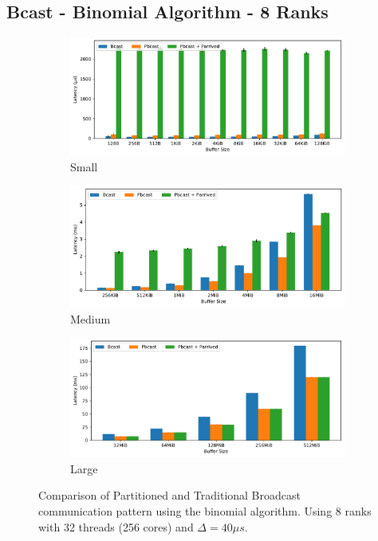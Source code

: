 \documentclass{article}
\begin{document}
  \clearpage
  \subsection{Bcast - Binomial Algorithm - 8 Ranks}
  \begin{figure}[h]
    \centering
    \begin{subfigure}[b]{0.44\textwidth}
      \centering
      \includegraphics[width=\textwidth]{data-knomial-2-bcast/small.pdf}
      \caption{Small}
    \end{subfigure}

    \begin{subfigure}[b]{0.44\textwidth}
      \centering
      \includegraphics[width=\textwidth]{data-knomial-2-bcast/med.pdf}
      \caption{Medium}
    \end{subfigure}
    \hfill

    \begin{subfigure}[b]{0.44\textwidth}
      \centering
      \includegraphics[width=\textwidth]{data-knomial-2-bcast/large.pdf}
      \caption{Large}
    \end{subfigure}
    \caption{Comparison of Partitioned and Traditional Broadcast communication
             pattern using the binomial algorithm. Using 8 ranks with 32 threads
             (256 cores) and $\Delta = 40\mu s$.}
  \end{figure}

  \clearpage
  
  
\end{document}
